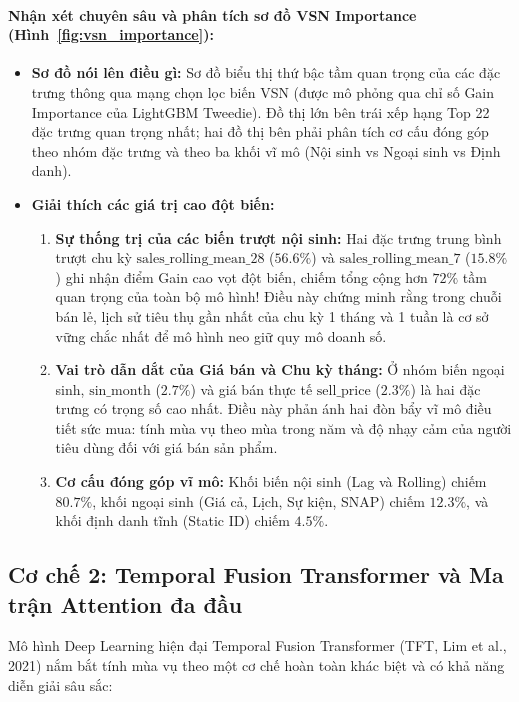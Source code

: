 \documentclass[12pt,a4paper,oneside]{article}
\begin{document}
\paragraph{Nhận xét chuyên sâu và phân tích sơ đồ VSN Importance (Hình~\ref{fig:vsn_importance}):}
\begin{itemize}
    \item \textbf{Sơ đồ nói lên điều gì:} Sơ đồ biểu thị thứ bậc tầm quan trọng của các đặc trưng thông qua mạng chọn lọc biến VSN (được mô phỏng qua chỉ số Gain Importance của LightGBM Tweedie). Đồ thị lớn bên trái xếp hạng Top 22 đặc trưng quan trọng nhất; hai đồ thị bên phải phân tích cơ cấu đóng góp theo nhóm đặc trưng và theo ba khối vĩ mô (Nội sinh vs Ngoại sinh vs Định danh).
    \item \textbf{Giải thích các giá trị cao đột biến:}
    \begin{enumerate}
        \item \textbf{Sự thống trị của các biến trượt nội sinh:} Hai đặc trưng trung bình trượt chu kỳ $\mathrm{sales\_rolling\_mean\_28}$ ($56.6\%$) và $\mathrm{sales\_rolling\_mean\_7}$ ($15.8\%$) ghi nhận điểm Gain cao vọt đột biến, chiếm tổng cộng hơn $72\%$ tầm quan trọng của toàn bộ mô hình! Điều này chứng minh rằng trong chuỗi bán lẻ, lịch sử tiêu thụ gần nhất của chu kỳ 1 tháng và 1 tuần là cơ sở vững chắc nhất để mô hình neo giữ quy mô doanh số.
        \item \textbf{Vai trò dẫn dắt của Giá bán và Chu kỳ tháng:} Ở nhóm biến ngoại sinh, $\mathrm{sin\_month}$ ($2.7\%$) và giá bán thực tế $\mathrm{sell\_price}$ ($2.3\%$) là hai đặc trưng có trọng số cao nhất. Điều này phản ánh hai đòn bẩy vĩ mô điều tiết sức mua: tính mùa vụ theo mùa trong năm và độ nhạy cảm của người tiêu dùng đối với giá bán sản phẩm.
        \item \textbf{Cơ cấu đóng góp vĩ mô:} Khối biến nội sinh (Lag và Rolling) chiếm $80.7\%$, khối ngoại sinh (Giá cả, Lịch, Sự kiện, SNAP) chiếm $12.3\%$, và khối định danh tĩnh (Static ID) chiếm $4.5\%$.
    \end{enumerate}
\end{itemize}

\subsection{Cơ chế 2: Temporal Fusion Transformer và Ma trận Attention đa đầu}
Mô hình Deep Learning hiện đại Temporal Fusion Transformer (TFT, Lim et al., 2021) nắm bắt tính mùa vụ theo một cơ chế hoàn toàn khác biệt và có khả năng diễn giải sâu sắc:
\end{document}
